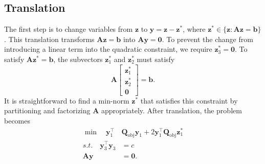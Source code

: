 \documentclass[journal,twoside]{IEEEtran}
\renewcommand{\vec}[1]{\mathbf{#1}}
\begin{document}
\subsection{Translation}\label{sec:solution-translation}
The first step is to change variables from $\vec{z}$ to $\vec{y}=\vec{z}-\vec{z}^*$, where
$\vec{z}^*\in\{\vec{z}:\mathbf{A}\vec{z} = \vec{b}\}$. This translation transforms $\mathbf{A}\vec{z} = \vec{b}$ into $\mathbf{A}\vec{y} = \vec{0}$. To
prevent the change from introducing a linear term into the quadratic
constraint, we require $\vec{z}_3^* = \vec{0}$. To satisfy $\mathbf{A}\vec{z}^* = \vec{b}$, the subvectors
$\vec{z}_1^*$ and $\vec{z}_2^*$ must satisfy
\[
\mathbf{A} \begin{bmatrix} \vec{z}_1^* \\ \vec{z}_2^*
\\ \vec{0} \end{bmatrix} = \vec{b}.
\]
It is straightforward to find a min-norm $\vec{z}^*$ that satisfies this constraint by partitioning and factorizing $\mathbf{A}$ appropriately. After translation, the problem becomes
\begin{subequations}\label{eq:translate}
\begin{align}
\label{eq:translate-obj} \min\quad \vec{y}_1^\top &\mathbf{Q}_\text{obj} \vec{y}_1 + 2 \vec{y}_1^\top \mathbf{Q}_\text{obj} \vec{z}_1^* \\
\label{eq:translate-quad} s.t.\quad \vec{y}_3^\top \vec{y}_3 &= c \\
\label{eq:translate-lin} \mathbf{A}\vec{y} &= \vec{0}.
\end{align}
\end{subequations}
\end{document}
